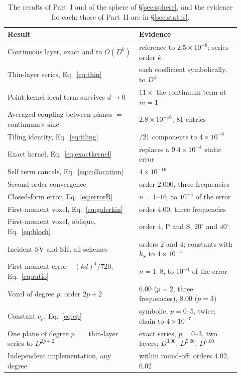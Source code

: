 \documentclass[11pt,a4paper]{article}
\newcommand{\sinc}{\operatorname{sinc}}
\begin{document}
\begin{table}[htbp]
\centering
\caption{The results of Part~I and of the sphere of \S\ref{sec:sphere}, and the evidence for each; those of Part~II are in \S\ref{sec:status}.}\label{tab:evidence}
\begin{tabular}{@{}>{\raggedright\arraybackslash}p{0.52\linewidth}>{\raggedright\arraybackslash}p{0.40\linewidth}@{}}
\toprule
Result & Evidence \\
\midrule
Continuous layer, exact and to $O(D^k)$ & reference to $2.5\times10^{-8}$; series order $k$ \\
Thin-layer series, Eq.~\eqref{eq:thin} & each coefficient symbolically, to $D^4$ \\
Point-kernel local term survives $d\to0$ & $11\times$ the continuum term at $m=1$ \\
Averaged coupling between planes $=$ continuum$\times\sinc$ & $2.8\times10^{-16}$, 81 entries \\
Tiling identity, Eq.~\eqref{eq:tiling} & 21/21 components to $4\times10^{-9}$ \\
Exact kernel, Eq.~\eqref{eq:exactkernel} & replaces a $9.4\times10^{-4}$ static error \\
Self term cancels, Eq.~\eqref{eq:collocation} & $4\times10^{-16}$ \\
Second-order convergence & order $2.000$, three frequencies \\
Closed-form error, Eq.~\eqref{eq:errorR} & $n=1$--$16$, to $10^{-4}$ of the error \\
First-moment voxel, Eq.~\eqref{eq:galerkin} & order $4.00$, three frequencies \\
First-moment voxel, oblique, Eq.~\eqref{eq:bloch} & order $4$, P and S, $20^\circ$ and $40^\circ$ \\
Incident SV and SH, all schemes & orders $2$ and $4$; constants with $k_S$ to $4\times10^{-4}$ \\
First-moment error $-(kd)^4/720$, Eq.~\eqref{eq:ratio} & $n=1$--$8$, to $10^{-4}$ of the error \\
Voxel of degree $p$: order $2p+2$ & $6.00$ ($p=2$, three frequencies), $8.00$ ($p=3$) \\
Constant $c_p$, Eq.~\eqref{eq:cp} & symbolic, $p=0$--$5$, twice; chain to $4\times10^{-7}$ \\
One plane of degree $p$ $=$ thin-layer series to $D^{2p+2}$ & exact series, $p=0$--$3$, two layers; $D^{3.00}$, $D^{5.00}$, $D^{7.00}$ \\
Independent implementation, any degree & within round-off; orders $4.02$, $6.02$ \\

\end{tabular}
\end{table}
\end{document}
